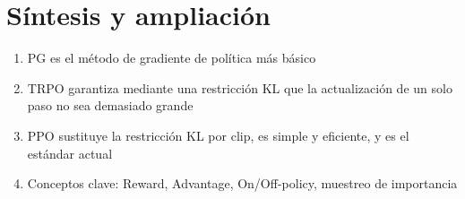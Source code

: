 \section{Síntesis y ampliación}
\begin{enumerate}
  \item PG es el método de gradiente de política más básico
  \item TRPO garantiza mediante una restricción KL que la actualización de un solo paso no sea demasiado grande
  \item PPO sustituye la restricción KL por clip, es simple y eficiente, y es el estándar actual
  \item Conceptos clave: Reward, Advantage, On/Off-policy, muestreo de importancia
\end{enumerate}


